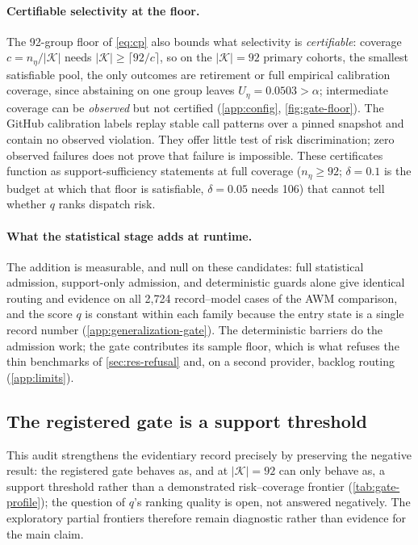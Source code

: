 \paragraph{Certifiable selectivity at the floor.}
The 92-group floor of \cref{eq:cp} also bounds what selectivity is
\emph{certifiable}: coverage $c=n_\eta/|\mathcal{K}|$ needs
$|\mathcal{K}|\ge\lceil 92/c\rceil$, so on the $|\mathcal{K}|=92$ primary
cohorts, the smallest satisfiable pool, the only outcomes are retirement or
full empirical calibration coverage, since abstaining on one group leaves
$U_\eta=0.0503>\alpha$; intermediate coverage can be \emph{observed} but not
certified (\cref{app:config}, \cref{fig:gate-floor}). The GitHub calibration
labels replay stable call patterns over a pinned snapshot and contain no
observed violation. They offer little test of risk discrimination; zero
observed failures does not prove that failure is impossible. These certificates
function as support-sufficiency statements at full coverage ($n_\eta\ge92$;
$\delta=0.1$ is the budget at which that floor is satisfiable, $\delta=0.05$
needs 106) that cannot tell whether $q$ ranks dispatch risk.

\paragraph{What the statistical stage adds at runtime.}
The addition is measurable, and null on these candidates: full statistical
admission, support-only admission, and deterministic guards alone give
identical routing and evidence on all 2{,}724 record--model cases of the AWM
comparison, and the score $q$ is constant within each family because the entry
state is a single record number (\cref{app:generalization-gate}). The
deterministic barriers do the admission work; the gate contributes its sample
floor, which is what refuses the thin benchmarks of \cref{sec:res-refusal} and,
on a second provider, backlog routing (\cref{app:limits}).

\subsection{The registered gate is a support threshold}

This audit strengthens the evidentiary record precisely by preserving the
negative result: the registered gate behaves as, and at $|\mathcal{K}|=92$ can
only behave as, a support threshold rather than a demonstrated risk--coverage
frontier (\cref{tab:gate-profile}); the question of $q$'s ranking quality is
open, not answered negatively. The exploratory partial frontiers therefore
remain diagnostic rather than evidence for the main claim.

